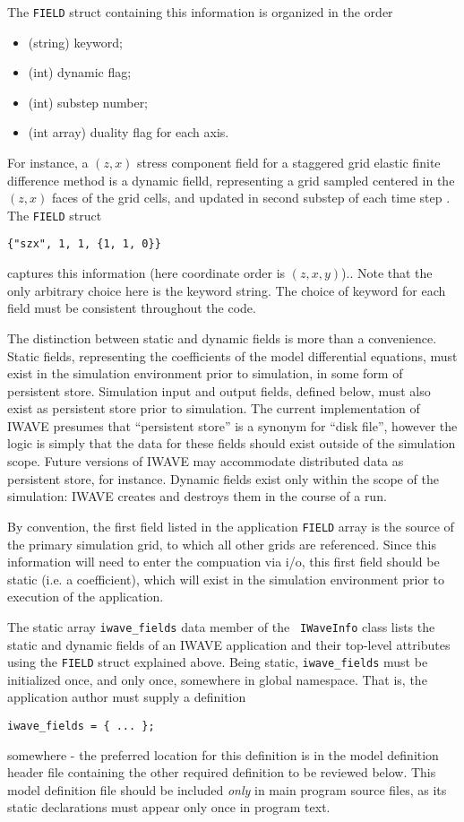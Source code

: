 The {\tt FIELD} struct containing this information is organized in the
order 
\begin{itemize}
\item (string) keyword;
\item (int) dynamic flag;
\item (int) substep number;
\item (int array) duality flag for each axis.
\end{itemize}
For instance, a $(z,x)$ stress component field for a staggered grid elastic
finite difference method is a dynamic fielld, representing a grid
sampled centered in the $(z,x)$ faces of the grid cells, and 
updated in second substep of each time step \cite{moczoetal:06}. The
{\tt FIELD} struct
\begin{verbatim}
{"szx", 1, 1, {1, 1, 0}}
\end{verbatim}
captures this information (here coordinate order is $(z,x,y)$).. Note that the only arbitrary
choice here is the keyword string. The choice of keyword for each field must be
consistent throughout the code.

The distinction between static and dynamic fields is more than a
convenience. Static fields, representing the coefficients of the model
differential equations, must exist in the simulation environment prior
to simulation, in some form of persistent store. Simulation input and output
fields, defined below, must also exist as persistent store prior to
simulation. The current
implementation of IWAVE presumes that ``persistent store'' is a
synonym for ``disk file'', however the logic is simply that the data
for these fields should exist outside of the simulation scope. Future
versions of IWAVE may accommodate distributed data as persistent
store, for instance. Dynamic fields exist only within the scope of the
simulation: IWAVE creates and destroys them in the course of a run.

By convention, the first field listed in the application {\tt FIELD}
array is the source of the primary simulation grid, to which all other
grids are referenced. Since this
information will need to enter the compuation via i/o, this first
field should be static (i.e. a coefficient), which will exist in the
simulation environment prior to execution of the application.

The static array {\tt iwave\_fields} data member of the {\tt
  IWaveInfo} class lists the static
and dynamic fields of an IWAVE
application and their top-level attributes using the {\tt FIELD} struct
explained above. Being static, {\tt iwave\_fields} must be
initialized once, and only once, somewhere in global namespace. That
is, the application author must supply a definition
\begin{verbatim}
iwave_fields = { ... };
\end{verbatim}
somewhere - the preferred location for this definition is in the
model definition header file containing the other required definition to
be reviewed below. This model definition file should be included {\em
  only} in main program source files, as its static declarations must
appear only once in program text.

